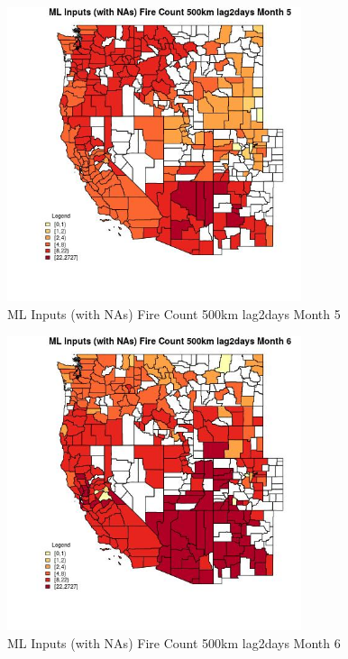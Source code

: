 \begin{figure} 
\centering  
\includegraphics[width=0.77\textwidth]{Code_Outputs/Report_ML_input_PM25_Step4_part_f_de_duplicated_aves_prioritize_24hr_obswNAs_CountyFire_Count_500km_lag2daysmedianMonth5.jpg} 
\caption{\label{fig:Report_ML_input_PM25_Step4_part_f_de_duplicated_aves_prioritize_24hr_obswNAsCountyFire_Count_500km_lag2daysmedianMonth5}ML Inputs (with NAs) Fire Count 500km lag2days Month 5} 
\end{figure} 
 

\begin{figure} 
\centering  
\includegraphics[width=0.77\textwidth]{Code_Outputs/Report_ML_input_PM25_Step4_part_f_de_duplicated_aves_prioritize_24hr_obswNAs_CountyFire_Count_500km_lag2daysmedianMonth6.jpg} 
\caption{\label{fig:Report_ML_input_PM25_Step4_part_f_de_duplicated_aves_prioritize_24hr_obswNAsCountyFire_Count_500km_lag2daysmedianMonth6}ML Inputs (with NAs) Fire Count 500km lag2days Month 6} 
\end{figure} 
 

